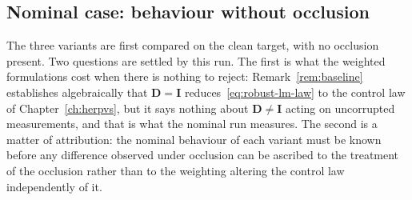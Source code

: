 %
%
%

\subsection{Nominal case: behaviour without occlusion}
\label{sec:nominal}

The three variants are first compared on the clean target, with no occlusion
present. Two questions are settled by this run. The first is what the weighted
formulations cost when there is nothing to reject:
Remark~\ref{rem:baseline} establishes algebraically that
$\mathbf{D}=\mathbf{I}$ reduces~\eqref{eq:robust-lm-law} to the control law of
Chapter~\ref{ch:herpvs}, but it says nothing about $\mathbf{D}\neq\mathbf{I}$
acting on uncorrupted measurements, and that is what the nominal run measures.
The second is a matter of attribution: the nominal behaviour of each variant
must be known before any difference observed under occlusion can be ascribed
to the treatment of the occlusion rather than to the weighting altering the
control law independently of it.

